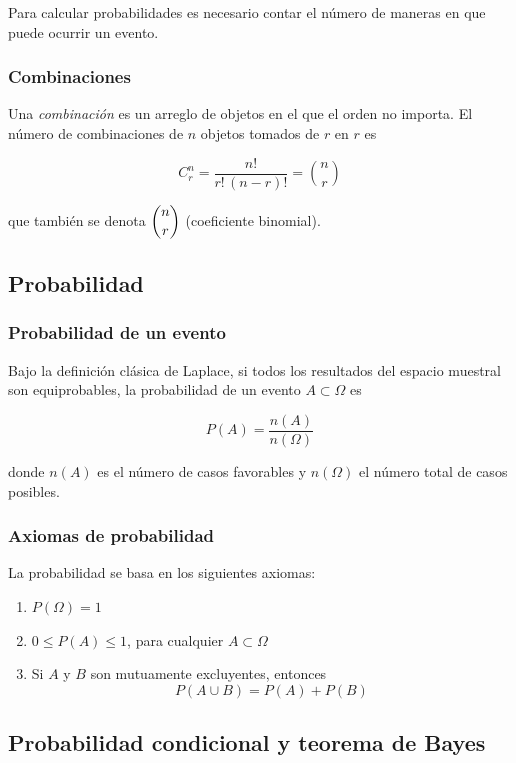 \documentclass[10pt,letterpaper]{article}
\begin{document}
Para calcular probabilidades es necesario contar el número de maneras en que puede ocurrir un evento.

\subsubsection{Combinaciones}

Una \textit{combinación} es un arreglo de objetos en el que el orden no importa. El número de combinaciones de $n$ objetos tomados de $r$ en $r$ es

\[C_r^n = \frac{n!}{r!\,(n-r)!} = \binom{n}{r}\]

que también se denota $\dbinom{n}{r}$ (coeficiente binomial).

\subsection{Probabilidad}

\subsubsection{Probabilidad de un evento}

Bajo la definición clásica de Laplace, si todos los resultados del espacio muestral son equiprobables, la probabilidad de un evento $A \subset \Omega$ es

\[P(A) = \frac{n(A)}{n(\Omega)}\]

donde $n(A)$ es el número de casos favorables y $n(\Omega)$ el número total de casos posibles.

\subsubsection{Axiomas de probabilidad}

La probabilidad se basa en los siguientes axiomas:

\begin{enumerate}[leftmargin=1.5em]
    \item $P(\Omega)=1$
    \item $0 \leq P(A) \leq 1$, para cualquier $A \subset \Omega$
    \item Si $A$ y $B$ son mutuamente excluyentes, entonces
    \[P(A \cup B) = P(A) + P(B)\]
\end{enumerate}

\subsection{Probabilidad condicional y teorema de Bayes}
\end{document}

